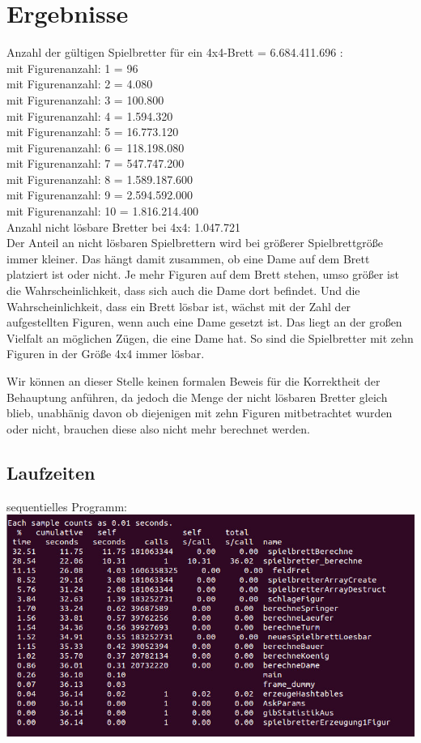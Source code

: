 \documentclass[
	12pt,
	a4paper,
	BCOR10mm,
	DIV14,
	listof=totoc,
	bibliography=totoc,
	headsepline
]{scrreprt}
\begin{document}
\chapter{Ergebnisse}
\label{Ergebnisse}

Anzahl der gültigen Spielbretter für ein 4x4-Brett = 6.684.411.696 :\\
mit Figurenanzahl:  1 =         96 \\
mit Figurenanzahl:  2 =       4.080 \\
mit Figurenanzahl:  3 =     100.800 \\
mit Figurenanzahl:  4 =    1.594.320 \\
mit Figurenanzahl:  5 =   16.773.120 \\
mit Figurenanzahl:  6 =  118.198.080 \\
mit Figurenanzahl:  7 =  547.747.200 \\
mit Figurenanzahl:  8 = 1.589.187.600 \\
mit Figurenanzahl:  9 = 2.594.592.000 \\
mit Figurenanzahl: 10 = 1.816.214.400 \\

Anzahl nicht lösbare Bretter bei 4x4: 1.047.721\\

Der Anteil an nicht lösbaren Spielbrettern wird bei größerer Spielbrettgröße immer kleiner. Das hängt damit zusammen, ob eine Dame auf dem Brett platziert ist oder nicht. Je mehr Figuren auf dem Brett stehen, umso größer ist die Wahrscheinlichkeit, dass sich auch die Dame dort befindet. Und die Wahrscheinlichkeit, dass ein Brett lösbar ist, wächst mit der Zahl der aufgestellten Figuren, wenn auch eine Dame gesetzt ist. 
Das liegt an der großen Vielfalt an möglichen Zügen, die eine Dame hat.
So sind die Spielbretter mit zehn Figuren in der Größe 4x4 immer lösbar.

Wir können an dieser Stelle keinen formalen Beweis für die Korrektheit der Behauptung anführen, da jedoch die Menge der nicht lösbaren Bretter gleich blieb, unabhänig davon ob diejenigen mit zehn Figuren mitbetrachtet wurden oder nicht, brauchen diese also nicht mehr berechnet werden. 

\section{Laufzeiten}
sequentielles Programm:\\
\includegraphics[scale=0.6]{gprof}
\end{document}
